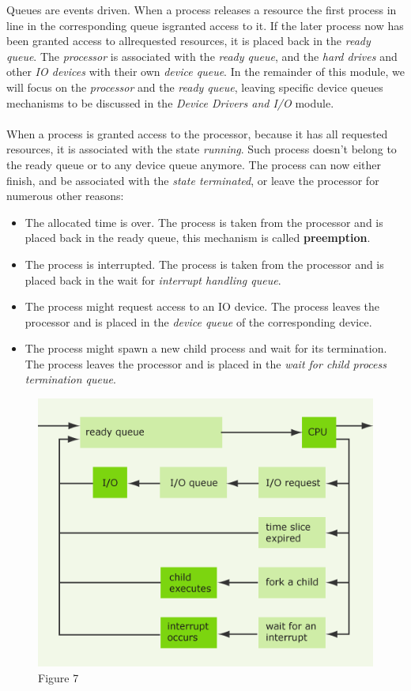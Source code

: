 \documentclass[11pt,a4paper]{scrreprt}
\begin{document}
Queues are events driven. When a process releases a resource the first process in line in the corresponding queue isgranted access to it. If the later process now has been granted access to allrequested resources, it is placed back in the \textit{ready queue}. The \textit{processor} is associated with the \textit{ready queue}, and the \textit{hard drives} and other \textit{IO devices} with their own \textit{device queue}. In the remainder of this module, we will focus on the \textit{processor} and the \textit{ready queue}, leaving specific device queues mechanisms to be discussed in the \textit{Device Drivers and I/O} module.\\\\
When a process is granted access to the processor, because it has all requested resources, it is associated with the state \textit{running}. Such process doesn’t belong to the ready queue or to any device queue anymore. The process can now either finish, and be associated with the \textit{state terminated}, or leave the processor for numerous other reasons:
\begin{itemize}
\item The allocated time is over. The process is taken from the processor and is placed back in the ready queue, this mechanism is called \textbf{preemption}.
\item The process is interrupted. The process is taken from the processor and is placed back in the wait for \textit{interrupt handling queue}.
\item The process might request access to an IO device. The process leaves the processor and is placed in the \textit{device queue} of the corresponding device.
\item The process might spawn a new child process and wait for its termination. The process leaves the processor and is placed in the \textit{wait for child process termination queue}.
\end{itemize}
\begin{figure}[!ht]
\centering
\includegraphics[width=0.8\linewidth]{img/Fig7.png}
\caption{Figure 7}
\label{fig:figure7}
\end{figure}
\end{document}
